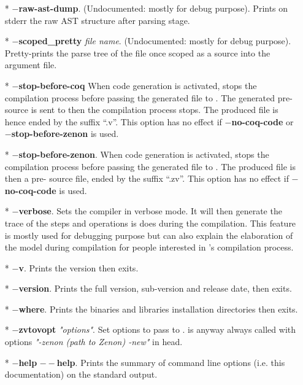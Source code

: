 \begin{itemize}
  \item[*] {\bf $-$raw-ast-dump}. (Undocumented: mostly for debug
    purpose). Prints on stderr the raw AST structure after parsing
    stage.

  \item[*] {\bf $-$scoped\_pretty} {\em file name}. (Undocumented:
    mostly for debug purpose). Pretty-prints the parse tree of the
    {\focal} file once scoped as a {\focal} source into the argument
    file.

  \item[*] {\bf $-$stop-before-coq} When {\coq} code generation is
    activated, stops the compilation process before passing the
    generated file to {\coq}. The generated pre-{\coq} source is sent to
    {\zenon} then the compilation process stops. The produced file is
    hence ended by the suffix ``.v''. This option has no effect if
    {\bf $-$no-coq-code} or {\bf $-$stop-before-zenon} is used.

   \item[*] {\bf $-$stop-before-zenon}. When {\coq} code generation is
     activated, stops the compilation process before passing the
     generated file to {\zenon}. The produced file is then a pre-{\coq}
     source file, ended by the suffix ``.zv''. This option has no
     effect if {\bf $-$no-coq-code} is used.

  \item[*] {\bf $-$verbose}. Sets the compiler in verbose mode. It
    will then generate the trace of the steps and operations is does
    during the compilation. This feature is mostly used for debugging
    purpose but can also explain the elaboration of the model during
    compilation for people interested in {\focal}'s compilation
    process.

  \item[*] {\bf $-$v}. Prints the {\focal} version then exits.

  \item[*] {\bf $-$version}. Prints the full {\focal} version,
    sub-version and release date, then exits.

  \item[*] {\bf $-$where}. Prints the binaries and libraries
    installation directories then exits.

  \item[*] {\bf $-$zvtovopt} {\em "options"}. Set options to pass to {\zvtov}.
    {\zvtov} is anyway always called with options
    {\em "-zenon (path to Zenon) -new"} in head.

  \item[*] {\bf $-$help} {\bf $--$help}. Prints the summary of command
    line options (i.e. this documentation) on the standard output.
\end{itemize}
